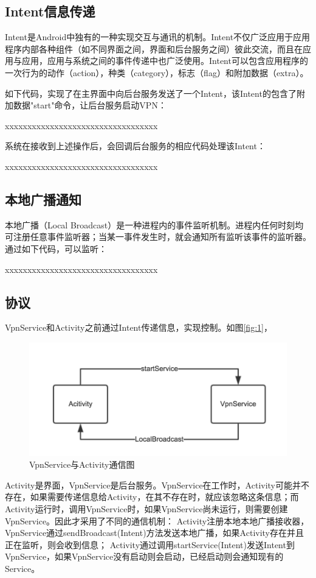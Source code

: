 \documentclass[format=final, language=chinese, degree=fyp]{hustthesis}
\begin{document}
\subsection{Intent信息传递}

Intent是Android中独有的一种实现交互与通讯的机制。Intent不仅广泛应用于应用程序内部各种组件（如不同界面之间，界面和后台服务之间）彼此交流，而且在应用与应用，应用与系统之间的事件传递中也广泛使用。Intent可以包含应用程序的一次行为的动作（action），种类（category），标志（flag）和附加数据（extra）。

如下代码，实现了在主界面中向后台服务发送了一个Intent，该Intent的包含了附加数据"start"命令，让后台服务启动VPN：

    xxxxxxxxxxxxxxxxxxxxxxxxxxxxxxxxxx

系统在接收到上述操作后，会回调后台服务的相应代码处理该Intent：

    xxxxxxxxxxxxxxxxxxxxxxxxxxxxxxxxxx

\subsection{本地广播通知}

本地广播（Local Broadcast）是一种进程内的事件监听机制。进程内任何时刻均可注册任意事件监听器；当某一事件发生时，就会通知所有监听该事件的监听器。通过如下代码，可以监听：


    xxxxxxxxxxxxxxxxxxxxxxxxxxxxxxxxxx


\subsection{协议}

VpnService和Activity之前通过Intent传递信息，实现控制。如图\autoref{fig:1}，

\begin{figure}[h!]
\centering
\includegraphics[width=.8\textwidth]{image_intent_commuciate.png}
\caption{VpnService与Activity通信图}\label{fig:1}
\end{figure}

Activity是界面，VpnService是后台服务。VpnService在工作时，Activity可能并不存在，如果需要传递信息给Activity，在其不存在时，就应该忽略这条信息；而Activity运行时，调用VpnService时，如果VpnService尚未运行，则需要创建VpnService。因此才采用了不同的通信机制：
Activity注册本地本地广播接收器，VpnService通过sendBroadcast(Intent)方法发送本地广播，如果Activity存在并且正在监听，则会收到信息；
Activity通过调用startService(Intent)发送Intent到VpnService，如果VpnService没有启动则会启动，已经启动则会通知现有的Service。
\end{document}
